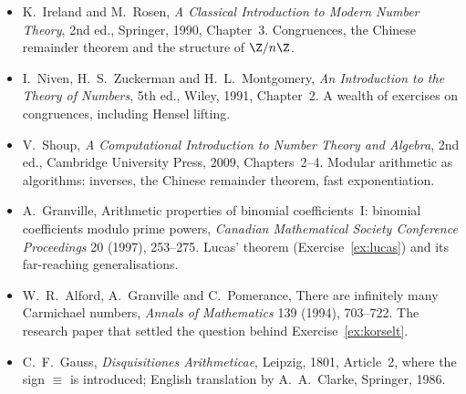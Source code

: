 \begin{itemize}
\item K.~Ireland and M.~Rosen, \emph{A Classical Introduction to Modern Number Theory}, 2nd ed., Springer, 1990, Chapter~3. Congruences, the Chinese remainder theorem and the structure of $\Z/n\Z$.
\item I.~Niven, H.~S.~Zuckerman and H.~L.~Montgomery, \emph{An Introduction to the Theory of Numbers}, 5th ed., Wiley, 1991, Chapter~2. A wealth of exercises on congruences, including Hensel lifting.
\item V.~Shoup, \emph{A Computational Introduction to Number Theory and Algebra}, 2nd ed., Cambridge University Press, 2009, Chapters~2--4. Modular arithmetic as algorithms: inverses, the Chinese remainder theorem, fast exponentiation.
\item A.~Granville, Arithmetic properties of binomial coefficients~I: binomial coefficients modulo prime powers, \emph{Canadian Mathematical Society Conference Proceedings} 20 (1997), 253--275. Lucas' theorem (Exercise~\ref{ex:lucas}) and its far-reaching generalisations.
\item W.~R.~Alford, A.~Granville and C.~Pomerance, There are infinitely many Carmichael numbers, \emph{Annals of Mathematics} 139 (1994), 703--722. The research paper that settled the question behind Exercise~\ref{ex:korselt}.
\item C.~F.~Gauss, \emph{Disquisitiones Arithmeticae}, Leipzig, 1801, Article~2, where the sign $\equiv$ is introduced; English translation by A.~A.~Clarke, Springer, 1986.
\end{itemize}
